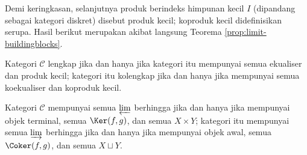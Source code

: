 Demi keringkasan, selanjutnya produk berindeks himpunan kecil $I$ (dipandang sebagai kategori diskret) disebut produk kecil; koproduk kecil didefinisikan serupa. Hasil berikut merupakan akibat langsung Teorema \ref{prop:limit-buildingblocks}.
\begin{corollary}\label{prop:completeness-criterion}
	Kategori $\mathcal{C}$ lengkap jika dan hanya jika kategori itu mempunyai semua ekualiser dan produk kecil; kategori itu kolengkap jika dan hanya jika mempunyai semua koekualiser dan koproduk kecil.

	Kategori $\mathcal{C}$ mempunyai semua $\varprojlim$ berhingga jika dan hanya jika mempunyai objek terminal, semua $\Ker(f,g)$, dan semua $X \times Y$; kategori itu mempunyai semua $\varinjlim$ berhingga jika dan hanya jika mempunyai objek awal, semua $\Coker(f,g)$, dan semua $X \sqcup Y$.
\end{corollary}

